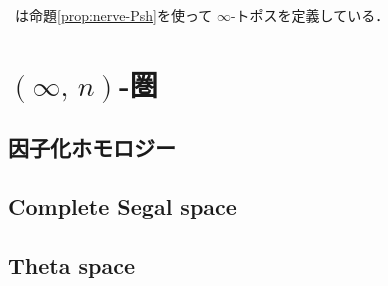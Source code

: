 \documentclass[TQFT_main]{subfiles}
\begin{document}
~\cite{alfonsi2023higher}は命題\ref{prop:nerve-Psh}を使って $\infty$-トポスを定義している．

\section{$(\infty,\, n)$-圏}

\subsection{因子化ホモロジー}

\subsection{Complete Segal space}

\subsection{Theta space}
\end{document}
